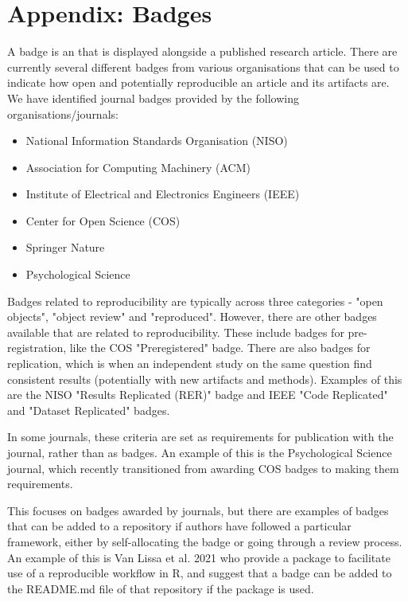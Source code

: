 \section{Appendix: Badges} \label{appendix:badges}

A badge is an that is displayed alongside a published research article. There are currently several different badges from various organisations that can be used to indicate how open and potentially reproducible an article and its artifacts are. We have identified journal badges provided by the following organisations/journals:
\begin{itemize}
    \item National Information Standards Organisation (NISO)
    \item Association for Computing Machinery (ACM)
    \item Institute of Electrical and Electronics Engineers (IEEE)
    \item Center for Open Science (COS)
    \item Springer Nature
    \item Psychological Science
\end{itemize}

Badges related to reproducibility are typically across three categories - "open objects", "object review" and "reproduced". However, there are other badges available that are related to reproducibility. These include badges for pre-registration, like the COS "Preregistered" badge.\autocite{blohowiak_badges_2023} There are also badges for replication, which is when an independent study on the same question find consistent results (potentially with new artifacts and methods). Examples of this are the NISO "Results Replicated (RER)" badge\autocite{niso_reproducibility_badging_and_definitions_working_group_reproducibility_2021} and IEEE "Code Replicated" and "Dataset Replicated" badges.\autocite{institute_of_electrical_and_electronics_engineers_ieee_about_nodate}

In some journals, these criteria are set as requirements for publication with the journal, rather than as badges. An example of this is the Psychological Science journal, which recently transitioned from awarding COS badges to making them requirements.\autocite{hardwicke_transparency_2023}

This focuses on badges awarded by journals, but there are examples of badges that can be added to a repository if authors have followed a particular framework, either by self-allocating the badge or going through a review process. An example of this is Van Lissa et al. 2021\autocite{van_lissa_worcs_2021} who provide a package to facilitate use of a reproducible workflow in R, and suggest that a badge can be added to the README.md file of that repository if the package is used.\autocite{van_lissa_worcs_2021}


